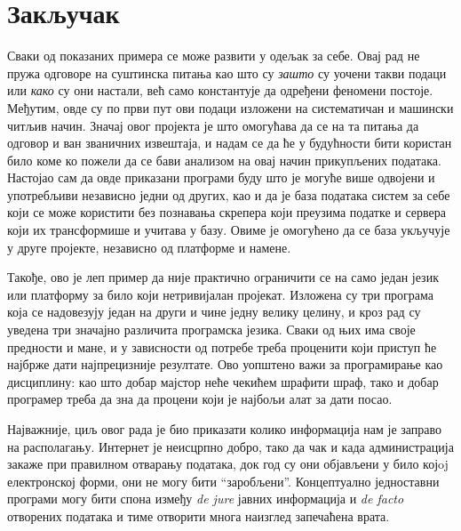 \section{Закључак}
Сваки од показаних примера се може развити у одељак за себе. Овај рад не пружа одговоре на суштинска питања као што су \emph{зашто} су уочени такви подаци или \emph{како} су они настали, већ само константује да одређени феномени постоје. Међутим, овде су по први пут ови подаци изложени на систематичан и машински читљив начин. Значај овог пројекта је што омогућава да се на та питања да одговор и ван званичних извештаја, и надам се да ће у будућности бити користан било коме ко пожели да се бави анализом на овај начин прикупљених података. Настојао сам да овде приказани програми буду што је могуће више одвојени и употребљиви независно једни од других, као и да је база података систем за себе који се може користити без познавања скрепера који преузима податке и сервера који их трансформише и учитава у базу. Овиме је омогућено да се база укључује у друге пројекте, независно од платформе и намене.

Такође, ово је леп пример да није практично ограничити се на само један језик или платформу за било који нетривијалан пројекат. Изложена су три програма која се надовезују један на други и чине једну велику целину, и кроз рад су уведена три значајно различита програмска језика. Сваки од њих има своје предности и мане, и у зависности од потребе треба проценити који приступ ће најбрже дати најпрецизније резултате. Ово уопштено важи за програмирање као дисциплину: као што добар мајстор неће чекићем шрафити шраф, тако и добар програмер треба да зна да процени који је најбољи алат за дати посао.

Најважније, циљ овог рада је био приказати колико информација нам је заправо на располагању. Интернет је неисцрпно добро, тако да чак и када администрација закаже при правилном отварању података, док год су они објављени у било којoj електронској форми, они не могу бити \enquote{заробљени}. Концептуално једноставни програми могу бити спона између \emph{de jure} јавних информација и \emph{de facto} отворених података и тиме отворити многа наизглед запечаћена врата.